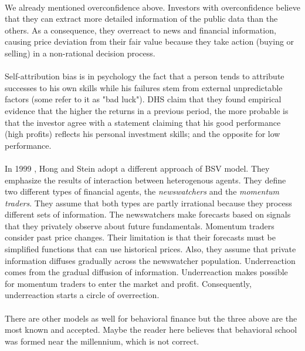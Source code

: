 \documentclass{article}
\begin{document}
\paragraph{ }
We already mentioned overconfidence above. Investors with overconfidence believe that they can extract more detailed information of the public data than the others. As a consequence, they overreact to news and financial information, causing price deviation from their fair value because they take action (buying or selling) in a non-rational decision process. 
\paragraph{ }
Self-attribution bias is in psychology the fact that a person tends to attribute successes to his own skills while his failures stem from external unpredictable factors (some refer to it as "bad luck"). DHS claim that they found empirical evidence  that the higher the returns in a previous period, the more probable is that the investor agree with a statement claiming that his good performance (high profits) reflects his personal  investment skills; and the opposite for low performance.
\paragraph{ }
In 1999 ,  Hong and Stein adopt a different approach of BSV model. They emphasize the results of interaction between heterogenous agents. They define two different types of financial agents, the \emph{newswatchers} and the \emph{momentum traders}. They assume that both types are partly irrational because they process different sets of information. The newswatchers make forecasts based on signals that they privately observe about future fundamentals. Momentum traders consider past price changes. Their limitation is that their forecasts must be simplified functions that can use historical prices. Also, they assume that private information diffuses gradually across the newswatcher population. Underreaction comes from the gradual diffusion of
information. Underreaction makes possible for momentum traders to enter the market and profit. Consequently, underreaction starts a circle of overrection.
\paragraph{ }
There are other models as well for behavioral finance but the three above are the most known and accepted. Maybe the reader here believes that behavioral school was formed near the millennium, which is not correct. 
\end{document}
